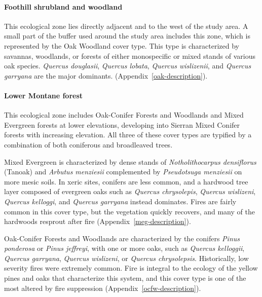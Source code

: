\paragraph*{Foothill shrubland and woodland} This ecological zone lies directly adjacent and to the west of the study area. A small part of the buffer used around the study area includes this zone, which is represented by the Oak Woodland cover type. This type is characterized by savannas, woodlands, or forests of either monospecific or mixed stands of various oak species. \emph{Quercus douglasii}, \emph{Quercus lobata}, \emph{Quercus wislizenii}, and \emph{Quercus garryana} are the major dominants. (Appendix~\ref{oak-description}). 

\paragraph*{Lower Montane forest} This ecological zone includes Oak-Conifer Forests and Woodlands and Mixed Evergreen forests at lower elevations, developing into Sierran Mixed Conifer forests with increasing elevation. All three of these cover types are typified by a combination of both coniferous and broadleaved trees. 

Mixed Evergreen is characterized by dense stands of \emph{Notholithocarpus densiflorus} (Tanoak) and \emph{Arbutus menziesii} complemented by \emph{Pseudotsuga menziesii} on more mesic soils. In xeric sites, conifers are less common, and a hardwood tree layer composed of evergreen oaks such as \emph{Quercus chrysolepis}, \emph{Quercus wislizeni}, \emph{Quercus kelloggi}, and \emph{Quercus garryana} instead dominates. Fires are fairly common in this cover type, but the vegetation quickly recovers, and many of the hardwoods resprout after fire (Appendix~\ref{meg-description}). 

Oak-Conifer Forests and Woodlands are characterized by the conifers \emph{Pinus ponderosa} or \emph{Pinus jeffreyi}, with one or more oaks, such as \emph{Quercus kelloggii}, \emph{Quercus garryana}, \emph{Quercus wislizeni}, or \emph{Quercus chrysolepsis}. Historically, low severity fires were extremely common. Fire is integral to the ecology of the yellow pines and oaks that characterize this system, and this cover type is one of the most altered by fire suppression (Appendix~\ref{ocfw-description}).

